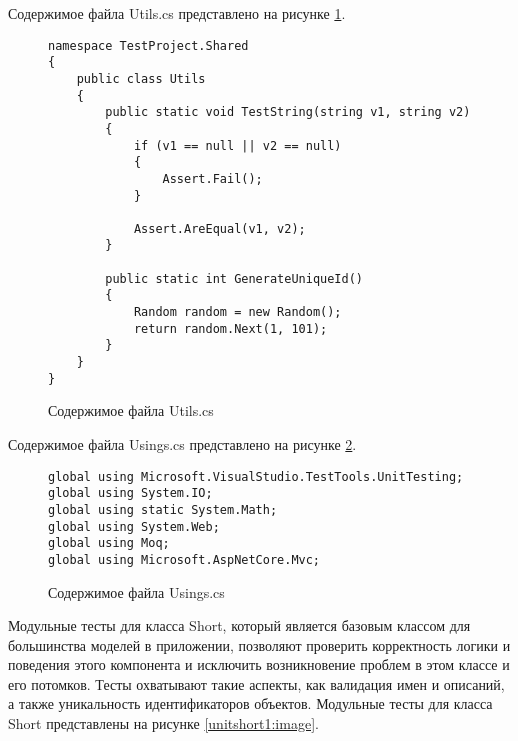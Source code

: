 Содержимое файла Utils.cs представлено на рисунке \ref{ut:image}.

\begin{figure}[!ht]
\lstset{style=sharpc}
\begin{lstlisting}
namespace TestProject.Shared
{
    public class Utils
    {
        public static void TestString(string v1, string v2)
        {
            if (v1 == null || v2 == null)
            {
                Assert.Fail();
            }

            Assert.AreEqual(v1, v2);
        }

        public static int GenerateUniqueId()
        {
            Random random = new Random();
            return random.Next(1, 101);
        }
    }
}
\end{lstlisting}
\caption{Содержимое файла Utils.cs}
\label{ut:image}
\end{figure}

Содержимое файла Usings.cs представлено на рисунке \ref{usings:image}.

\begin{figure}[!ht]
\lstset{style=sharpc}
\begin{lstlisting}
global using Microsoft.VisualStudio.TestTools.UnitTesting;
global using System.IO;
global using static System.Math;
global using System.Web;
global using Moq;
global using Microsoft.AspNetCore.Mvc;
\end{lstlisting}
\caption{Содержимое файла Usings.cs}
\label{usings:image}
\end{figure}

Модульные тесты для класса Short, который является базовым классом для большинства моделей в приложении, позволяют проверить корректность логики и поведения этого компонента и исключить возникновение проблем в этом классе и его потомков. Тесты охватывают такие аспекты, как валидация имен и описаний, а также уникальность идентификаторов объектов.
Модульные тесты для класса Short представлены на рисунке \ref{unitshort1:image}.

